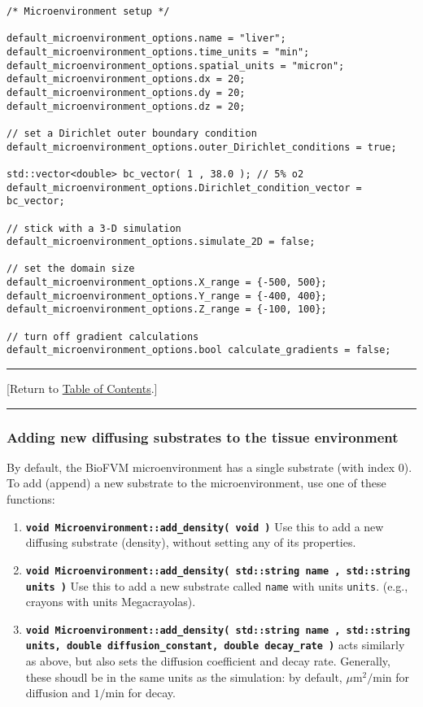 \documentclass[12pt]{article}
\newcommand{\micron}{\mu\textrm{m}}
\renewcommand{\v}{\verb}
\newcommand{\smallcode}[1]{\textbf{\texttt{#1}}}
\newcommand{\TOClink}{\begin{center}\hrule\vskip-10pt\phantom{.}\hfill[Return to \hyperlink{TOC}{Table of Contents}.]\hfill\phantom{.}\vskip3pt\hrule\end{center}}
\begin{document}
\begin{verbatim}
/* Microenvironment setup */ 

default_microenvironment_options.name = "liver"; 
default_microenvironment_options.time_units = "min"; 
default_microenvironment_options.spatial_units = "micron"; 
default_microenvironment_options.dx = 20; 
default_microenvironment_options.dy = 20;  
default_microenvironment_options.dz = 20; 
	
// set a Dirichlet outer boundary condition 
default_microenvironment_options.outer_Dirichlet_conditions = true;

std::vector<double> bc_vector( 1 , 38.0 ); // 5% o2  
default_microenvironment_options.Dirichlet_condition_vector = bc_vector; 
	
// stick with a 3-D simulation 
default_microenvironment_options.simulate_2D = false; 

// set the domain size 
default_microenvironment_options.X_range = {-500, 500};  
default_microenvironment_options.Y_range = {-400, 400}; 
default_microenvironment_options.Z_range = {-100, 100}; 
	
// turn off gradient calculations 
default_microenvironment_options.bool calculate_gradients = false; 
\end{verbatim}


\TOClink 
\subsubsection{Adding new diffusing substrates to the tissue environment}
\label{sec:BioFVM_add_substrates}
By default, the BioFVM microenvironment has a single substrate (with index 0). 
To add (append) a new substrate to the microenvironment, use one of these functions: 

\begin{enumerate}
\item 
\smallcode{void Microenvironment::add\_density( void )} Use this to add a new diffusing 
substrate (density), without setting any of its properties. 

\item 
\smallcode{void Microenvironment::add\_density( std::string name , std::string units )} Use this 
to add a new substrate called \v|name| with units \v|units|. (e.g., crayons with units Megacrayolas). 

\item 
\smallcode{void Microenvironment::add\_density( std::string name , std::string units, double diffusion\_constant, double decay\_rate )} acts similarly as above, but also sets the diffusion coefficient and decay rate. Generally, 
these shoudl be in the same units as the simulation: by default, $\micron^2/\textrm{min}$ for diffusion 
and $1/\textrm{min}$ for decay. 
\end{enumerate}
\end{document}
